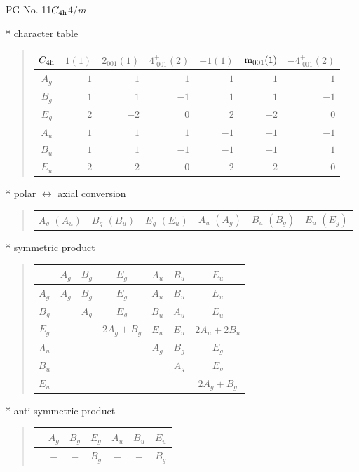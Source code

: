 \documentclass[fleqn,8pt,landscape]{jsarticle}
\begin{document}
\setcounter{MaxMatrixCols}{32}

\renewcommand{\tablename}{Table~}
\renewcommand{\figurename}{Figure~}
\begin{center}
\LARGE
PG No. 11\quad$C_{\rm 4h}$\quad$4/m$\quad[ tetragonal ]
\end{center}

* character table
\begin{quote}
\begin{tabular}{crrrrrr} \hline \hline
$ C_{\rm 4h} $ & $ 1(1) $ & $ 2{}_{001}(1) $ & $ 4^{+}_{\,\,001}(2) $ & $ -1(1) $ & $ {\rm m}_{001}(1) $ & $ -4^{+}_{\,\,001}(2) $ \\ \hline
$ A_{g} $ & $ 1 $ & $ 1 $ & $ 1 $ & $ 1 $ & $ 1 $ & $ 1 $ \\
$ B_{g} $ & $ 1 $ & $ 1 $ & $ -1 $ & $ 1 $ & $ 1 $ & $ -1 $ \\
$ E_{g} $ & $ 2 $ & $ -2 $ & $ 0 $ & $ 2 $ & $ -2 $ & $ 0 $ \\
$ A_{u} $ & $ 1 $ & $ 1 $ & $ 1 $ & $ -1 $ & $ -1 $ & $ -1 $ \\
$ B_{u} $ & $ 1 $ & $ 1 $ & $ -1 $ & $ -1 $ & $ -1 $ & $ 1 $ \\
$ E_{u} $ & $ 2 $ & $ -2 $ & $ 0 $ & $ -2 $ & $ 2 $ & $ 0 $ \\
 \hline \hline
\end{tabular}
\end{quote}

* polar $\leftrightarrow$ axial conversion
\begin{quote}
\begin{tabular}{cccccc}
$ A_{g}\,\,(A_{u}) $ & $ B_{g}\,\,(B_{u}) $ & $ E_{g}\,\,(E_{u}) $ & $ A_{u}\,\,(A_{g}) $ & $ B_{u}\,\,(B_{g}) $ & $ E_{u}\,\,(E_{g}) $
\end{tabular}
\end{quote}

* symmetric product
\begin{quote}
\begin{tabular}{c|cccccc} \hline \hline
 & $ A_{g} $ & $ B_{g} $ & $ E_{g} $ & $ A_{u} $ & $ B_{u} $ & $ E_{u} $ \\ \hline
$ A_{g} $ & $ A_{g} $ & $ B_{g} $ & $ E_{g} $ & $ A_{u} $ & $ B_{u} $ & $ E_{u} $ \\
$ B_{g} $ & $  $ & $ A_{g} $ & $ E_{g} $ & $ B_{u} $ & $ A_{u} $ & $ E_{u} $ \\
$ E_{g} $ & $  $ & $  $ & $ 2 A_{g} + B_{g} $ & $ E_{u} $ & $ E_{u} $ & $ 2 A_{u} + 2 B_{u} $ \\
$ A_{u} $ & $  $ & $  $ & $  $ & $ A_{g} $ & $ B_{g} $ & $ E_{g} $ \\
$ B_{u} $ & $  $ & $  $ & $  $ & $  $ & $ A_{g} $ & $ E_{g} $ \\
$ E_{u} $ & $  $ & $  $ & $  $ & $  $ & $  $ & $ 2 A_{g} + B_{g} $ \\
 \hline \hline
\end{tabular}
\end{quote}

* anti-symmetric product
\begin{quote}
\begin{tabular}{ccccccc} \hline \hline
 & $ A_{g} $ & $ B_{g} $ & $ E_{g} $ & $ A_{u} $ & $ B_{u} $ & $ E_{u} $ \\ \hline
$  $ & $ - $ & $ - $ & $ B_{g} $ & $ - $ & $ - $ & $ B_{g} $ \\
 \hline \hline
\end{tabular}
\end{quote}
\end{document}
